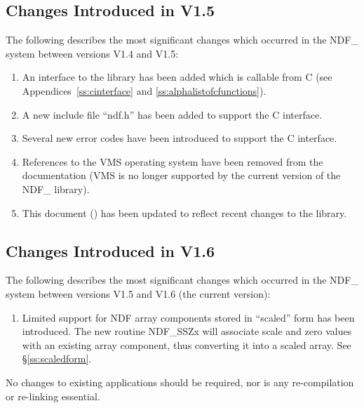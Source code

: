 \subsection{Changes Introduced in V1.5}

The following describes the most significant changes which occurred in
the NDF\_ system between versions V1.4 and V1.5:

\begin{enumerate}
\item An interface to the library has been added which is callable
from C (see Appendices~\ref{ss:cinterface} and
\ref{ss:alphalistofcfunctions}).

\item A new include file ``ndf.h'' has been added to support the
C interface.

\item Several new error codes have been introduced to support the C
interface.

\item References to the VMS operating system have been removed from
the documentation (VMS is no longer supported by the current version
of the NDF\_ library).

\item This document () has been updated to
reflect recent changes to the library.
\end{enumerate}

\subsection{Changes Introduced in V1.6}

The following describes the most significant changes which occurred in
the NDF\_ system between versions V1.5 and V1.6 (the current version):

\begin{enumerate}
\item Limited support for NDF array components stored in ``scaled'' form
has been introduced. The new routine NDF\_SSZx will associate scale and
zero values with an existing array component, thus converting it into a
scaled array. See \S\ref{ss:scaledform}.

\end{enumerate}

No changes to existing applications should be required, nor is any
re-compilation or re-linking essential.

